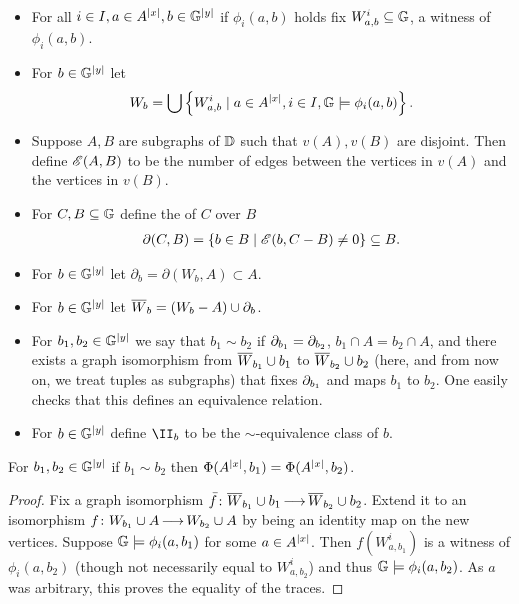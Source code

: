 \documentclass{amsart}
\begin{document}
\begin{Definition} \label{def_e}\ 
  \begin{itemize}
  \item For all $i \in I, a \in A^{|x|}, b \in \mathbb G^{|y|}$ if $\phi_i(a, b)$ holds fix $W^i_{a,b} \subseteq \mathbb G$, a witness of $\phi_i(a, b)$.
  \item For $b \in \mathbb G^{|y|}$ let 
    \begin{align*}
      W_b = \bigcup \left\{W^i_{a,b} \mid a \in A^{|x|}, i \in I, \mathbb G \models \phi_i(a,b)\right\}.
    \end{align*}
  \item Suppose $A, B$ are subgraphs of $\mathbb D$ such that $v(A), v(B)$ are disjoint.
    Then define $\mathscr E(A, B)$ to be the number of edges between the vertices in $v(A)$ and the vertices in $v(B)$.
  \item For $C, B \subseteq \mathbb G$ define the \defn{boundary} of $C$ over $B$
    \begin{align*}
      \partial(C, B) = \left\{b \in B \mid \mathscr E(b, C - B) \neq 0\right\} \subseteq B.
    \end{align*}
  \item For $b \in \mathbb G^{|y|}$ let $\partial_b = \partial(W_b, A) \subset A$.
  \item For $b \in \mathbb G^{|y|}$ let ${\overline{W}}_b = (W_b - A) \cup \partial_b$.
  \item For $b_1, b_2 \in \mathbb G^{|y|}$ we say that $b_1 \sim b_2$ if $\partial_{b_1} = \partial_{b_2}$,
    $b_1 \cap A = b_2 \cap A$,
    and there exists a graph isomorphism from ${\overline{W}}_{b_1} \cup b_1$ to ${\overline{W}}_{b_2} \cup b_2$
    (here, and from now on, we treat tuples as subgraphs)
    that fixes $\partial_{b_1}$ and
    maps $b_1$ to $b_2$.
    One easily checks that this defines an equivalence relation.
  \item For $b \in \mathbb G^{|y|}$ define $\II_b$ to be the $\sim$-equivalence class of $b$.
  \end{itemize}
\end{Definition}

\begin{Lemma} \label {bound_trace}
  For $b_1, b_2 \in \mathbb G^{|y|}$ if $b_1 \sim b_2$ then $\Phi(A^{|x|}, b_1) = \Phi(A^{|x|}, b_2)$.
\end{Lemma}

\begin{proof}
  Fix a graph isomorphism $\bar f \colon {\overline{W}}_{b_1} \cup b_1 \operatorname{\longrightarrow} {\overline{W}}_{b_2} \cup b_2$.
  Extend it to an isomorphism $f \colon W_{b_1} \cup A \operatorname{\longrightarrow} W_{b_2} \cup A$ by being an identity map on the new vertices.
  Suppose $\mathbb G \models \phi_i(a, b_1)$ for some $a \in A^{|x|}$.
  Then $f(W^i_{a, b_1})$ is a witness of $\phi_i(a, b_2)$ (though not necessarily equal to $W^i_{a, b_2}$)
  and thus $\mathbb G \models \phi_i(a, b_2)$.
  As $a$ was arbitrary, this proves the equality of the traces.
\end{proof}
\end{document}
